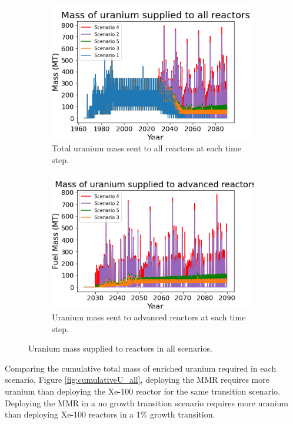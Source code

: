 \begin{figure}
    \centering
    \begin{subfigure}{0.45\textwidth}
        \centering
        \includegraphics[scale=0.4]{../figures/fuelsupply_scenarios_all.png}
        \caption{Total uranium mass sent to all reactors at each time step.}
        \label{fig:totalfuel_all}
    \end{subfigure}
    \hspace{0.8cm}
    \begin{subfigure}{0.45\textwidth}
        \centering
        \includegraphics[scale=0.4]{../figures/advancedRX_fuelsupply_scenarios_2-5.png}
        \caption{Uranium mass sent to advanced reactors at each time step.}
        \label{fig:haleufuel_all}
    \end{subfigure}
    \caption{Uranium mass supplied to reactors in all scenarios.}
    \label{fig:fuel_all}
\end{figure}

Comparing the cumulative total mass of enriched uranium required in each scenario, 
Figure \ref{fig:cumulativeU_all}, deploying the \gls{MMR} 
requires more uranium than deploying the Xe-100 reactor for the same 
transition scenario. Deploying the \gls{MMR} in a no growth transition 
scenario requires more uranium than deploying Xe-100 reactors in a 1\% 
growth transition. 

